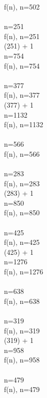 \documentclass{article}
\begin{document}
f(n), n=502
 \\ 
 \Rightarrow {} 
 \\ 
 \Rightarrow n=251
 \\[3mm] 
f(n), n=251
 \\ 
 (251) + 1
 \\ 
 \Rightarrow n=754
 \\[3mm] 
f(n), n=754
 \\ 
 \Rightarrow {} 
 \\ 
 \Rightarrow n=377
 \\[3mm] 
f(n), n=377
 \\ 
 (377) + 1
 \\ 
 \Rightarrow n=1132
 \\[3mm] 
f(n), n=1132
 \\ 
 \Rightarrow {} 
 \\ 
 \Rightarrow n=566
 \\[3mm] 
f(n), n=566
 \\ 
 \Rightarrow {} 
 \\ 
 \Rightarrow n=283
 \\[3mm] 
f(n), n=283
 \\ 
 (283) + 1
 \\ 
 \Rightarrow n=850
 \\[3mm] 
f(n), n=850
 \\ 
 \Rightarrow {} 
 \\ 
 \Rightarrow n=425
 \\[3mm] 
f(n), n=425
 \\ 
 (425) + 1
 \\ 
 \Rightarrow n=1276
 \\[3mm] 
f(n), n=1276
 \\ 
 \Rightarrow {} 
 \\ 
 \Rightarrow n=638
 \\[3mm] 
f(n), n=638
 \\ 
 \Rightarrow {} 
 \\ 
 \Rightarrow n=319
 \\[3mm] 
f(n), n=319
 \\ 
 (319) + 1
 \\ 
 \Rightarrow n=958
 \\[3mm] 
f(n), n=958
 \\ 
 \Rightarrow {} 
 \\ 
 \Rightarrow n=479
 \\[3mm] 
f(n), n=479
 \\ 
\end{document}
